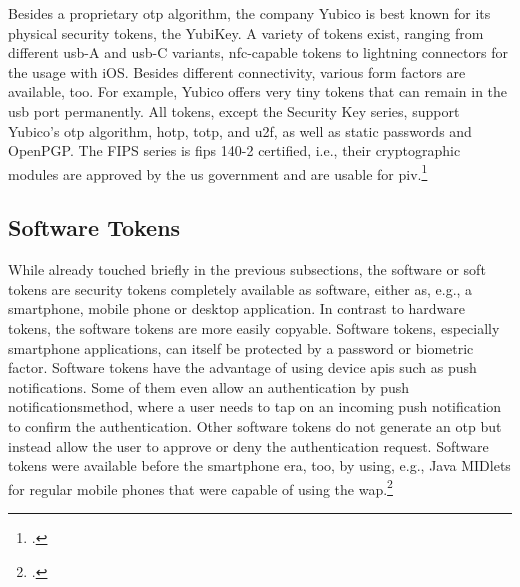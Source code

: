 Besides a proprietary \gls{otp} algorithm, the company Yubico is best known for its physical security tokens, the YubiKey. A variety of tokens exist, ranging from different \gls{usb}-A and \gls{usb}-C variants, \gls{nfc}-capable tokens to lightning connectors for the usage with iOS. Besides different connectivity, various form factors are available, too. For example, Yubico offers very tiny tokens that can remain in the \gls{usb} port permanently. All tokens, except the \frqq Security Key\flqq{} series, support Yubico's \gls{otp} algorithm, \gls{hotp}, \gls{totp}, and \gls{u2f}, as well as static passwords and OpenPGP. The \frqq FIPS series\flqq{} is \gls{fips} 140-2 certified, i.e., their cryptographic modules are approved by the \gls{us} government and are usable for \gls{piv}.\footcites[See][716]{HUSEYNOV2017715}[See][83]{Jacobs:2016:STA:2953926.2953927}[See][109]{Jacobs:2019}

\subsection{Software Tokens}

While already touched briefly in the previous subsections, the software or soft tokens are security tokens completely available as software, either as, e.g., a smartphone, mobile phone or desktop application. In contrast to hardware tokens, the software tokens are more easily copyable. Software tokens, especially smartphone applications, can itself be protected by a password or biometric factor. Software tokens have the advantage of using device \glspl{api} such as push notifications. Some of them even allow an \frqq authentication by push notifications\flqq method, where a user needs to tap on an incoming push notification to confirm the authentication. Other software tokens do not generate an \gls{otp} but instead allow the user to approve or deny the authentication request. Software tokens were available before the smartphone era, too, by using, e.g., Java MIDlets for regular mobile phones that were capable of using the \gls{wap}.\footcites[See][717]{HUSEYNOV2017715}[See][111]{ELMALIKI201475}[See][60]{Ulqinaku:2019:FPP:3317549.3323404}[See][222--223]{dasgupta2017multi}[See][3]{4300040}
